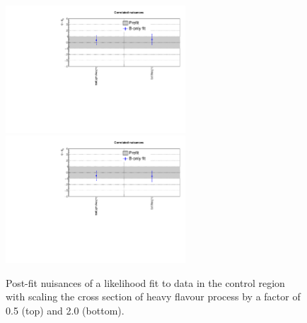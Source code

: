 \begin{figure}[h!]
  \centering
  \includegraphics[width=0.6\textwidth]{figures/ZPlusbb/TemplateFitv1_HFXs0p5}
  \includegraphics[width=0.6\textwidth]{figures/ZPlusbb/TemplateFitv1_HFXs2p0}
  \caption{Post-fit nuisances of a likelihood fit to data in the \mmj
    control region with scaling the cross section of heavy flavour
    process by a factor of 0.5 (top) and 2.0 (bottom). }
  \label{fig:zplusbb2}
\end{figure}

